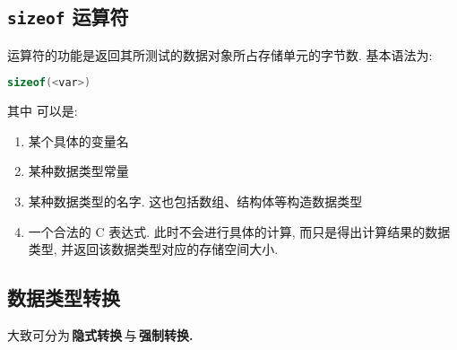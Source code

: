     \subsection{\texttt{sizeof} 运算符}
        \hspace*{2em}  运算符的功能是返回其所测试的数据对象所占存储单元的字节数. 基本语法为:
            \begin{lstlisting}[language = {C}, gobble = 16]
                sizeof(<var>)
            \end{lstlisting}

        其中  可以是:
            \begin{enumerate}
                \item 某个具体的变量名
                \item 某种数据类型常量
                \item 某种数据类型的名字. 这也包括数组、结构体等构造数据类型
                \item 一个合法的 C 表达式. 此时不会进行具体的计算, 而只是得出计算结果的数据类型, 并返回该数据类型对应的存储空间大小.
            \end{enumerate}

    \subsection{数据类型转换}
        \hspace*{2em} 大致可分为\,\textbf{隐式转换}\,与\,\textbf{强制转换.}

